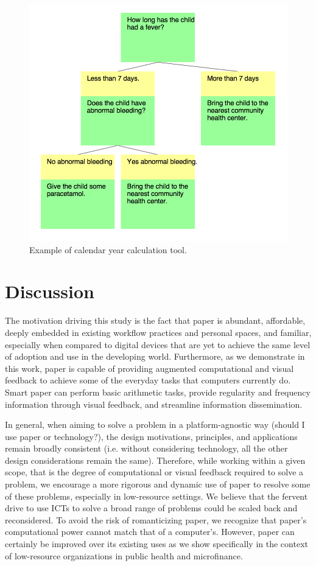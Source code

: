 \documentclass{sig-alternate}
\begin{document}
\begin{figure}
\centering
\includegraphics[width=.6\linewidth]{img/flowchart-input.png}
\caption{Example of calendar year calculation tool.}
\label{fig:flowchart-input}
\end{figure}







\section{Discussion}
\label{sec:discussion}

The motivation driving this study is the fact that paper is abundant, affordable, deeply embedded in existing workflow practices and personal spaces, and familiar, especially when compared to digital devices that are yet to achieve the same level of adoption and use in the developing world. Furthermore, as we demonstrate in this work, paper is capable of providing augmented computational and visual feedback to achieve some of the everyday tasks that computers currently do. Smart paper can perform basic arithmetic tasks, provide regularity and frequency information through visual feedback, and streamline information dissemination. 

In general, when aiming to solve a problem in a platform-agnostic way (should I use paper or technology?), the design motivations, principles, and applications remain broadly consistent (i.e. without considering technology, all the other design considerations remain the same). Therefore, while working within a given scope, that is the degree of computational or visual feedback required to solve a problem, we encourage a more rigorous and dynamic use of paper to resolve some of these problems, especially in low-resource settings. We believe that the fervent drive to use ICTs to solve a broad range of problems could be scaled back and reconsidered. To avoid the risk of romanticizing paper, we recognize that paper's computational power cannot match that of a computer's. However, paper can certainly be improved over its existing uses as we show specifically in the context of low-resource organizations in public health and microfinance.
\end{document}
